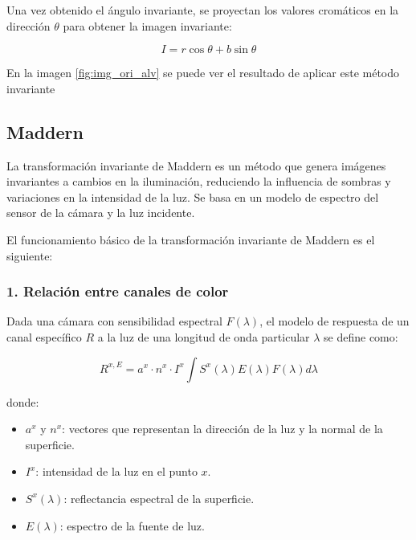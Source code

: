 Una vez obtenido el ángulo invariante, se proyectan los valores cromáticos en la dirección $\theta$ para obtener la imagen invariante:

$$I=r\cos \theta +b\sin \theta$$

En la imagen \ref{fig:img_ori_alv} se puede ver el resultado de aplicar este método invariante

\subsection{Maddern}\label{maddern}

La transformación invariante de Maddern \cite{maddern2014} es un método que genera imágenes invariantes a cambios en la iluminación, reduciendo la influencia de sombras y variaciones en la intensidad de la luz. Se basa en un modelo de espectro del sensor de la cámara y la luz incidente.

El funcionamiento básico de la transformación invariante de Maddern es el siguiente:

\subsubsection{1. Relación entre canales de color}

Dada una cámara con sensibilidad espectral $F(\lambda )$, el modelo de respuesta de un canal específico $R$ a la luz de una longitud de onda particular $\lambda$ se define como:

$$R^{x,E} =a^x \cdot n^x \cdot I^x \int S^x (\lambda )E(\lambda )F(\lambda )d\lambda$$

donde:

\begin{itemize}
\setlength{\itemsep}{-1ex}
   \item{\begin{flushleft} $a^x$ y $n^x$: vectores que representan la dirección de la luz y la normal de la superficie. \end{flushleft}}
   \item{\begin{flushleft} $I^x$: intensidad de la luz en el punto $x$. \end{flushleft}}
   \item{\begin{flushleft} $S^x (\lambda )$: reflectancia espectral de la superficie. \end{flushleft}}
   \item{\begin{flushleft} $E(\lambda )$: espectro de la fuente de luz. \end{flushleft}}
\end{itemize}

